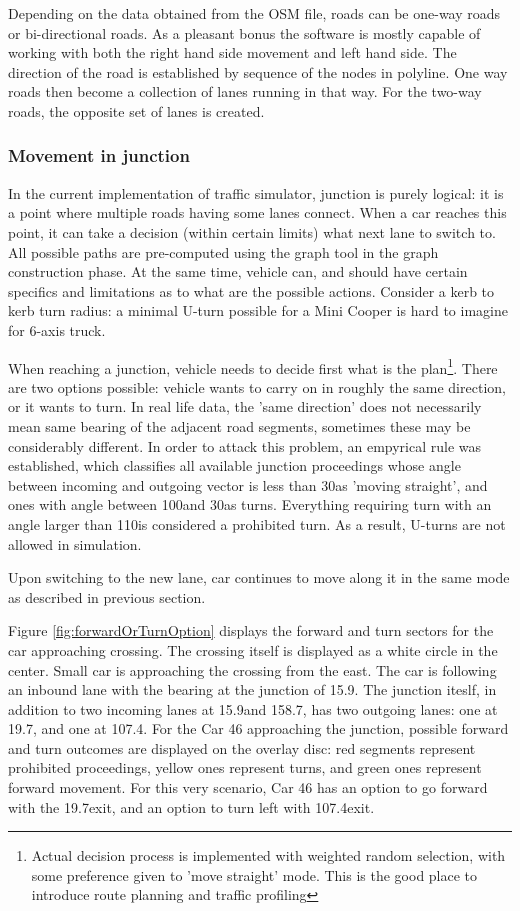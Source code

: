 Depending on the data obtained from the OSM file, roads can be one-way roads or bi-directional roads. As a pleasant bonus the software is mostly capable of working with both the right hand side movement and left hand side. The direction of the road is established by sequence of the nodes in polyline. One way roads then become a collection of lanes running in that way. For the two-way roads, the opposite set of lanes is created.

\subsubsection{Movement in junction}
In the current implementation of traffic simulator, junction is purely logical: it is a point where multiple roads having some lanes connect. When a car reaches this point, it can take a decision (within certain limits) what next lane to switch to. All possible paths are pre-computed using the graph tool in the graph construction phase. At the same time, vehicle can, and should have certain specifics and limitations as to what are the possible actions. Consider a kerb to kerb turn radius: a minimal U-turn possible for a Mini Cooper is hard to imagine for 6-axis truck.

When reaching a junction, vehicle needs to decide first what is the plan\footnote{Actual decision process is implemented with weighted random selection, with some preference given to 'move straight' mode. This is the good place to introduce route planning and traffic profiling}. There are two options possible: vehicle wants to carry on in roughly the same direction, or it wants to turn. In real life data, the 'same direction' does not necessarily mean same bearing of the adjacent road segments, sometimes these may be considerably different. In order to attack this problem, an empyrical rule was established, which classifies all available junction proceedings whose angle between incoming and outgoing vector is less than 30\degspc  as 'moving straight', and ones with angle between 100\degspc  and 30\degspc as turns. Everything requiring turn with an angle larger than 110\degspc is considered a prohibited turn. As a result, U-turns are not allowed in simulation.

Upon switching to the new lane, car continues to move along it in the same mode as described in previous section.

Figure \ref{fig:forwardOrTurnOption} displays the forward and turn sectors for the car approaching crossing. The crossing itself is displayed as a white circle in the center. Small car is approaching the crossing from the east. The car is following an inbound lane with the bearing at the junction of 15.9\degspc. The junction iteslf, in addition to two incoming lanes at 15.9\degspc and 158.7\degspc, has two outgoing lanes: one at 19.7\degspc, and one at 107.4\degspc. For the Car 46 approaching the junction, possible forward and turn outcomes are displayed on the overlay disc: red segments represent prohibited proceedings, yellow ones represent turns, and green ones represent forward movement. For this very scenario, Car 46 has an option to go forward with the 19.7\degspc exit, and an option to turn left with 107.4\degspc exit.

